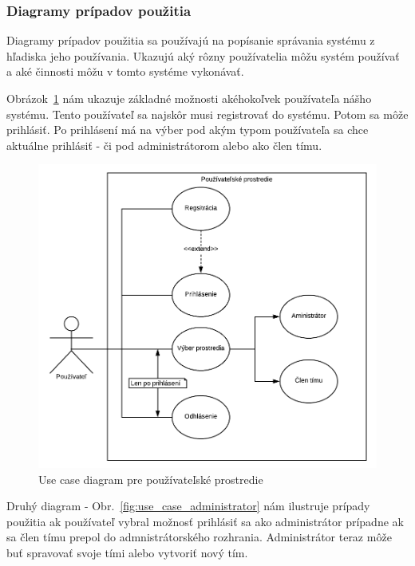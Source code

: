 \subsubsection{Diagramy prípadov použitia}
\indent Diagramy prípadov použitia sa používajú na popísanie správania systému z hľadiska jeho používania. Ukazujú aký rôzny používatelia môžu systém používať a aké činnosti môžu v tomto systéme vykonávať.

\indent Obrázok~\ref{fig:use_case_pozivatel} nám ukazuje základné možnosti akéhokoľvek používateľa nášho systému. Tento používateľ sa najskôr musi registrovať do systému. Potom sa môže prihlásiť. Po prihlásení má na výber pod akým typom používateľa sa chce aktuálne prihlásiť - či pod administrátorom alebo ako člen tímu. 

\begin{figure}[H]
    \centering
    \includegraphics[scale=0.50]{img/DP_use_case_pouzivatel.png}
    \caption{Use case diagram pre používateľské prostredie}
    \label{fig:use_case_pozivatel}
\end{figure}

\indent Druhý diagram - Obr.~\ref{fig:use_case_administrator} nám ilustruje prípady použitia ak používateľ vybral možnosť prihlásiť sa ako administrátor prípadne ak sa člen tímu prepol do admnistrátorského rozhrania. Administrátor teraz môže buť spravovať svoje tími alebo vytvoriť nový tím.

